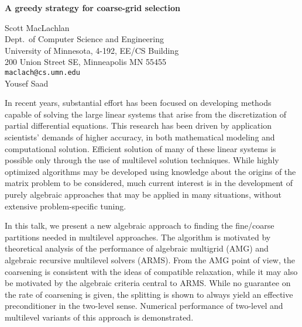 \documentclass{report}
\begin{document}

\begin{center}
{\large
{\bf A greedy strategy for coarse-grid selection}}

	Scott MacLachlan \\
	Dept.~of Computer Science and Engineering \\
	University of Minnesota, 4-192, EE/CS Building \\
	200 Union Street SE, Minneapolis MN 55455 \\
	{\tt maclach@cs.umn.edu} \\
	Yousef Saad
\end{center}
In recent years, substantial effort has been focused on
developing methods capable of solving the large linear
systems that arise from the discretization of partial
differential equations. This research has been driven by
application scientists' demands of higher accuracy, in both
mathematical modeling and computational solution. Efficient
solution of many of these linear systems is possible only
through the use of multilevel solution techniques. While
highly optimized algorithms may be developed using knowledge
about the origins of the matrix problem to be considered,
much current interest is in the development of purely
algebraic approaches that may be applied in many situations,
without extensive problem-specific tuning.

In this talk,
we present a new algebraic approach to finding the
fine/coarse partitions needed in multilevel approaches. The
algorithm is motivated by theoretical analysis of the
performance of algebraic multigrid (AMG) and algebraic
recursive multilevel solvers (ARMS). From the AMG point of
view, the coarsening is consistent with the ideas of
compatible relaxation, while it may also be motivated by the
algebraic criteria central to ARMS. While no guarantee on
the rate of coarsening is given, the splitting is shown to
always yield an effective preconditioner in the two-level
sense. Numerical performance of two-level and multilevel
variants of this approach is demonstrated.



\end{document}

